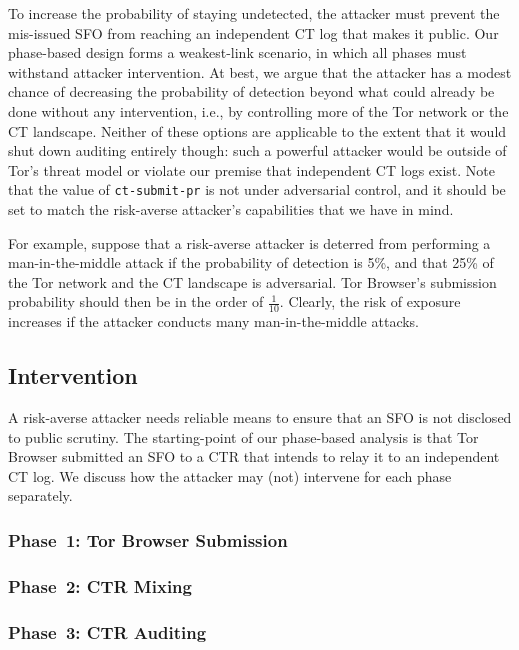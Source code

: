 To increase the probability of staying undetected, the attacker must prevent the
mis-issued SFO from reaching an independent CT log that makes it public.  Our
phase-based design forms a weakest-link scenario, in which all phases must
withstand attacker intervention.  At best, we argue that the attacker has a
modest chance of decreasing the probability of detection beyond what could
already be done without any intervention, i.e., by controlling more of the Tor
network or the CT landscape.  Neither of these options are applicable to the
extent that it would shut down auditing entirely though:
	such a powerful attacker would be outside of Tor's threat model or
	violate our premise that independent CT logs exist.
Note that the value of \texttt{ct-submit-pr} is not under adversarial control,
and it should be set to match the risk-averse attacker's capabilities that we
have in mind.

For example, suppose that a risk-averse attacker is deterred from performing a
man-in-the-middle attack if the probability of detection is 5\%, and that
25\% of the Tor network and the CT landscape is adversarial.  Tor Browser's
submission probability should then be in the order of $\frac{1}{10}$.  Clearly,
the risk of exposure increases if the attacker conducts many man-in-the-middle
attacks.

\subsection{Intervention}
A risk-averse attacker needs reliable means to ensure that an SFO is not
disclosed to public scrutiny.  The starting-point of our phase-based analysis is
that Tor Browser submitted an SFO to a CTR that intends to relay it to an
independent CT log.  We discuss how the attacker may (not) intervene for each
phase separately.

\subsubsection{Phase~1: Tor Browser Submission}

\subsubsection{Phase~2: CTR Mixing}

\subsubsection{Phase~3: CTR Auditing}
